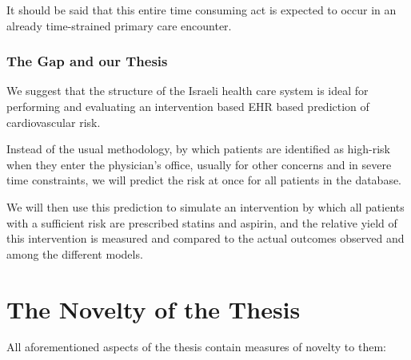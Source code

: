 \documentclass[a4paper,12pt]{article}
\begin{document}
			It should be said that this entire time consuming act is expected to occur in an already time-strained primary care encounter\cite{Konrad2010}.
			
			\subsubsection{The Gap and our Thesis}
			
			We suggest that the structure of the Israeli health care system is ideal for performing and evaluating an intervention based EHR based prediction of cardiovascular risk.
			
			Instead of the usual methodology, by which patients are identified as high-risk when they enter the physician's office, usually for other concerns and in severe time constraints, we will predict the risk at once for all patients in the database.
			
			We will then use this  prediction to simulate an intervention by which all patients with a sufficient risk are  prescribed statins and aspirin, and the relative yield of this intervention is measured and compared to the actual outcomes observed and among the different models.
	
	\section{The Novelty of the Thesis}
	
	All aforementioned aspects of the thesis contain measures of novelty to them:
	
\end{document}
